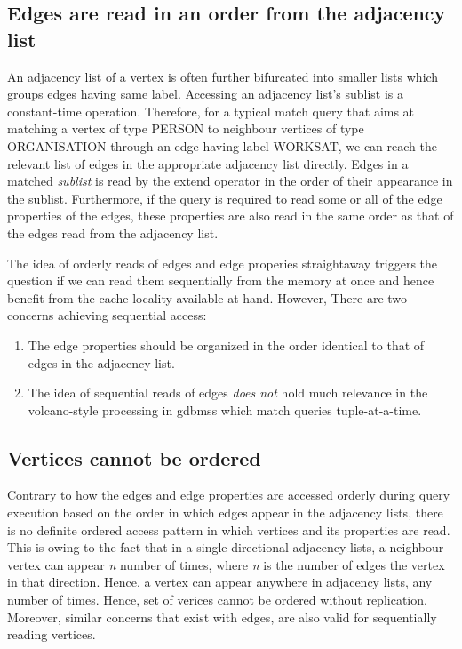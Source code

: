 \subsection{Edges are read in an order from the adjacency list}
An adjacency list of a vertex is often further bifurcated into smaller lists which groups edges having same label. Accessing an adjacency list's sublist is a constant-time operation. Therefore, for a typical match query that aims at matching a vertex of type PERSON to neighbour vertices of type ORGANISATION through an edge having label WORKSAT, we can reach the relevant list of edges in the appropriate adjacency list directly. Edges in a matched \emph{sublist} is read by the extend operator in the order of their appearance in the sublist. Furthermore, if the query is required to read some or all of the edge properties of the edges, these properties are also read in the same order as that of the edges read from the adjacency list. 

The idea of orderly reads of edges and edge properies straightaway triggers the question if we can read them sequentially from the memory at once and hence benefit from the cache locality available at hand. However, There are two concerns achieving sequential access: 
\begin{enumerate}
	\item The edge properties should be organized in the order identical to that of edges in the adjacency list.
	\item The idea of sequential reads of edges \emph{does not} hold much relevance in the volcano-style processing in \gls{gdbms}s which match queries tuple-at-a-time.
\end{enumerate}

\subsection{Vertices cannot be ordered}

Contrary to how the edges and edge properties are accessed orderly during query execution based on the order in which edges appear in the adjacency lists, there is no definite ordered access pattern in which vertices and its properties are read. This is owing to the fact that in a single-directional adjacency lists, a neighbour vertex can appear \textit{n} number of times, where \textit{n} is the number of edges the vertex in that direction. Hence, a vertex can appear anywhere in adjacency lists, any number of times. Hence, set of verices cannot be ordered without replication. Moreover, similar concerns that exist with edges, are also valid for sequentially reading vertices.


